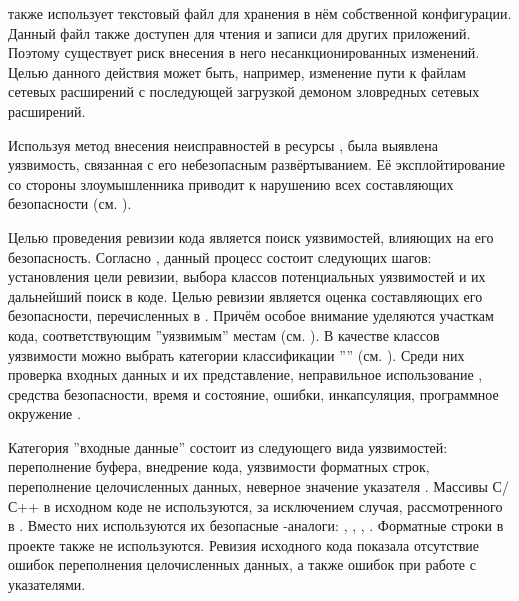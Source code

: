 %
 также использует текстовый файл для хранения в нём собственной конфигурации. 
%
Данный файл также доступен для чтения и записи для других приложений. 
%
Поэтому существует риск внесения в него несанкционированных изменений. 
%
Целью данного действия может быть, например, изменение пути к файлам сетевых расширений с последующей загрузкой демоном зловредных сетевых расширений.

%
Используя метод внесения неисправностей в ресурсы , была выявлена уязвимость, связанная с его небезопасным развёртыванием. 
%
Её эксплойтирование со стороны злоумышленника приводит к нарушению всех составляющих безопасности  (см. ).


%
Целью проведения ревизии кода  является поиск уязвимостей, влияющих на его безопасность.  
%
Согласно  , данный процесс состоит следующих шагов: установления цели ревизии, выбора классов потенциальных уязвимостей и их дальнейший поиск в коде. 
%
Целью ревизии  является оценка составляющих его безопасности, перечисленных в . 
%
Причём особое внимание уделяются участкам кода, соответствующим ''уязвимым'' местам (см. ). 
%
В качестве классов уязвимости можно выбрать категории классификации '''' (см. ). 
%
Среди них проверка входных данных и их представление, неправильное использование , средства безопасности, время и состояние, ошибки, инкапсуляция, программное окружение . 

%
Категория ''входные данные'' состоит из следующего вида уязвимостей: переполнение буфера, внедрение кода, уязвимости форматных строк, переполнение целочисленных данных, неверное значение указателя . 
%
Массивы С/С++ в исходном коде  не используются, за исключением случая, рассмотренного в . 
%
Вместо них используются их безопасные -аналоги: , , ,  . 
%
Форматные строки в проекте также не используются. 
%
Ревизия исходного кода показала отсутствие ошибок переполнения целочисленных данных, а также ошибок при работе с указателями. 

